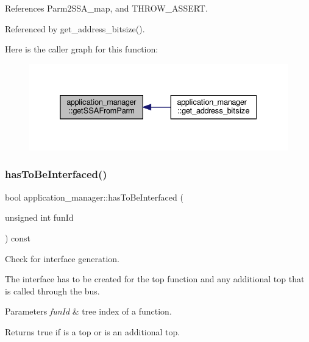 References Parm2\+S\+S\+A\+\_\+map, and T\+H\+R\+O\+W\+\_\+\+A\+S\+S\+E\+RT.



Referenced by get\+\_\+address\+\_\+bitsize().

Here is the caller graph for this function\+:
\nopagebreak
\begin{figure}[H]
\begin{center}
\leavevmode
\includegraphics[width=332pt]{dc/db5/classapplication__manager_ae5944dcfaf586cd7109e762136f29a43_icgraph}
\end{center}
\end{figure}
\mbox{\label{classapplication__manager_a7dd91f4c02d88ca6064d113520e6632c}} 
\subsubsection{\texorpdfstring{has\+To\+Be\+Interfaced()}{hasToBeInterfaced()}}
{\footnotesize\ttfamily bool application\+\_\+manager\+::has\+To\+Be\+Interfaced (\begin{DoxyParamCaption}\item[{unsigned int}]{fun\+Id }\end{DoxyParamCaption}) const}



Check for interface generation. 

The interface has to be created for the top function and any additional top that is called through the bus.


\begin{DoxyParams}{Parameters}
{\em fun\+Id} & tree index of a function.\\
\hline
\end{DoxyParams}
\begin{DoxyReturn}{Returns}
true if is a top or is an additional top. 
\end{DoxyReturn}



